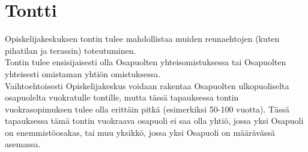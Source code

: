 \documentclass[a4paper, 12pt, finnish]{report}
\begin{document}
\section*{Tontti}
Opiskelijakeskuksen tontin tulee mahdollistaa muiden reunaehtojen (kuten pihatilan ja terassin) toteutuminen.\\

Tontin tulee ensisijaisesti olla Osapuolten yhteisomistuksessa tai Osapuolten yhteisesti omistaman yhtiön omistuksessa.\\

Vaihtoehtoisesti Opiskelijakeskus voidaan rakentaa Osapuolten ulkopuoliselta osapuolelta vuokratulle tontille, mutta tässä tapauksessa tontin vuokrasopimuksen tulee olla erittäin pitkä (esimerkiksi 50-100 vuotta).
Tässä tapauksessa tämä tontin vuokraava osapuoli ei saa olla yhtiö, jossa yksi Osapuoli on enemmistöosakas, tai muu yksikkö, jossa yksi Osapuoli on määrävässä asemassa.


\newpage
\end{document}
